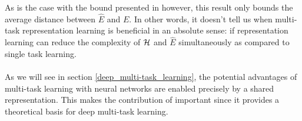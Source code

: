 As is the case with the bound presented in \citet{baxter1995} however, this result only bounds the average distance between $\hat{E}$ and $E$. In other words, it doesn't tell us when multi-task representation learning is beneficial in an absolute sense: if representation learning can reduce the complexity of $\mathcal{H}$ and $\hat{E}$ simultaneously as compared to single task learning.
\\\\
As we will see in section \ref{deep_multi-task_learning}, the potential advantages of multi-task learning with neural networks are enabled precisely by a shared representation. This makes the contribution of \citet{baxter1995} important since it provides a theoretical basis for deep multi-task learning.